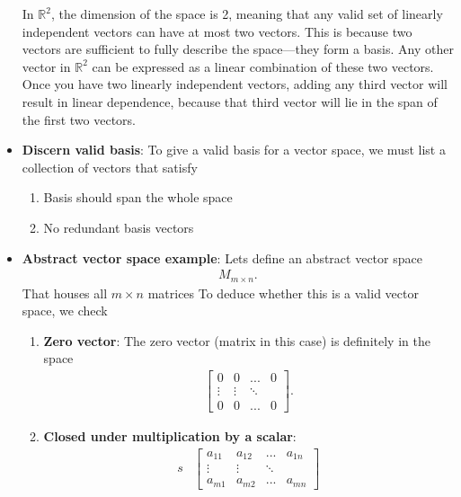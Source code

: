 \documentclass{report}
\begin{document}
\begin{itemize}
            \bigbreak \noindent 
            In $\mathbb{R}^{2}$, the dimension of the space is 2, meaning that any valid set of linearly independent vectors can have at most two vectors. This is because two vectors are sufficient to fully describe the space—they form a basis. Any other vector in $\mathbb{R}^{2}$ can be expressed as a linear combination of these two vectors.
            \bigbreak \noindent 
            Once you have two linearly independent vectors, adding any third vector will result in linear dependence, because that third vector will lie in the span of the first two vectors.
        \item \textbf{Discern valid basis}: To give a valid basis for a vector space, we must list a collection of vectors that satisfy
            \begin{enumerate}
                \item Basis should span the whole space
                \item No redundant basis vectors
            \end{enumerate}
        \item \textbf{Abstract vector space example}: Lets define an abstract vector space
            \begin{align*}
                M_{m\times n}
            .\end{align*}
            That houses all $m\times n$ matrices
            \bigbreak \noindent 
            To deduce whether this is a valid vector space, we check
            \begin{enumerate}
                \item \textbf{Zero vector}: The zero vector (matrix in this case) is definitely in the space
                    \begin{align*}\begin{bmatrix} 0 & 0 & ... &0 \\ \vdots & \vdots& \ddots \\ 0 & 0 & ... & 0 \end{bmatrix} .\end{align*}
                \item \textbf{Closed under multiplication by a scalar}:
                    \begin{align*}
                        s&\begin{bmatrix} a_{11} & a_{12} & ... & a_{1n} \\ \vdots & \vdots & \ddots \\ a_{m1} & a_{m2} & ... & a_{mn}\end{bmatrix} \\

\end{align*}
\end{enumerate}
\end{itemize}
\end{document}
